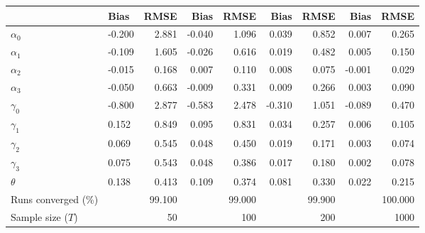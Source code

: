 
\begin{tabular}[t]{llrrrrrrr}
\toprule
  & Bias & RMSE & Bias & RMSE & Bias & RMSE & Bias & RMSE\\
\midrule
$\alpha_{0}$ & -0.200 & 2.881 & -0.040 & 1.096 & 0.039 & 0.852 & 0.007 & 0.265\\
$\alpha_{1}$ & -0.109 & 1.605 & -0.026 & 0.616 & 0.019 & 0.482 & 0.005 & 0.150\\
$\alpha_{2}$ & -0.015 & 0.168 & 0.007 & 0.110 & 0.008 & 0.075 & -0.001 & 0.029\\
$\alpha_{3}$ & -0.050 & 0.663 & -0.009 & 0.331 & 0.009 & 0.266 & 0.003 & 0.090\\
$\gamma_{0}$ & -0.800 & 2.877 & -0.583 & 2.478 & -0.310 & 1.051 & -0.089 & 0.470\\
$\gamma_{1}$ & 0.152 & 0.849 & 0.095 & 0.831 & 0.034 & 0.257 & 0.006 & 0.105\\
$\gamma_{2}$ & 0.069 & 0.545 & 0.048 & 0.450 & 0.019 & 0.171 & 0.003 & 0.074\\
$\gamma_{3}$ & 0.075 & 0.543 & 0.048 & 0.386 & 0.017 & 0.180 & 0.002 & 0.078\\
$\theta$ & 0.138 & 0.413 & 0.109 & 0.374 & 0.081 & 0.330 & 0.022 & 0.215\\
Runs converged (\%) &  & 99.100 &  & 99.000 &  & 99.900 &  & 100.000\\
Sample size ($T$) &  & 50 &  & 100 &  & 200 &  & 1000\\
\bottomrule
\end{tabular}
